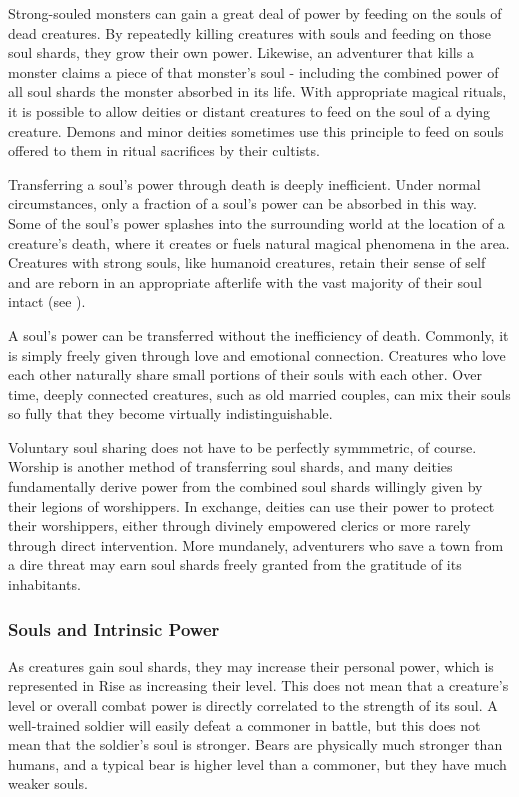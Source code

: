             Strong-souled monsters can gain a great deal of power by feeding on the souls of dead creatures.
            By repeatedly killing creatures with souls and feeding on those soul shards, they grow their own power.
            Likewise, an adventurer that kills a monster claims a piece of that monster's soul - including the combined power of all soul shards the monster absorbed in its life.
            With appropriate magical rituals, it is possible to allow deities or distant creatures to feed on the soul of a dying creature.
            Demons and minor deities sometimes use this principle to feed on souls offered to them in ritual sacrifices by their cultists.

            Transferring a soul's power through death is deeply inefficient.
            Under normal circumstances, only a fraction of a soul's power can be absorbed in this way.
            Some of the soul's power splashes into the surrounding world at the location of a creature's death, where it creates or fuels natural magical phenomena in the area.
            Creatures with strong souls, like humanoid creatures, retain their sense of self and are reborn in an appropriate afterlife with the vast majority of their soul intact (see ).

            A soul's power can be transferred without the inefficiency of death.
            Commonly, it is simply freely given through love and emotional connection.
            Creatures who love each other naturally share small portions of their souls with each other.
            Over time, deeply connected creatures, such as old married couples, can mix their souls so fully that they become virtually indistinguishable.

            Voluntary soul sharing does not have to be perfectly symmmetric, of course.
            Worship is another method of transferring soul shards, and many deities fundamentally derive power from the combined soul shards willingly given by their legions of worshippers.
            In exchange, deities can use their power to protect their worshippers, either through divinely empowered clerics or more rarely through direct intervention.
            More mundanely, adventurers who save a town from a dire threat may earn soul shards freely granted from the gratitude of its inhabitants.

        \subsubsection{Souls and Intrinsic Power}
            As creatures gain soul shards, they may increase their personal power, which is represented in Rise as increasing their level.
            This does not mean that a creature's level or overall combat power is directly correlated to the strength of its soul.
            A well-trained soldier will easily defeat a commoner in battle, but this does not mean that the soldier's soul is stronger.
            Bears are physically much stronger than humans, and a typical bear is higher level than a commoner, but they have much weaker souls.

